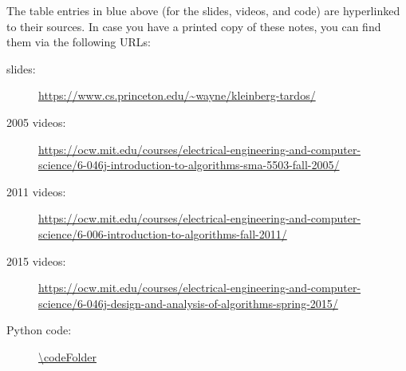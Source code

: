 \documentclass[11pt]{article}
\begin{document}
\medskip

The table entries in blue above (for the slides, videos, and code) are hyperlinked to their sources.
In case you have a printed copy of these notes, you can find them via the following
URLs:

\parbox{0.8\textwidth}{\footnotesize

  \begin{description}
  \item[\KT slides:] \url{https://www.cs.princeton.edu/~wayne/kleinberg-tardos/}
  \item[2005 videos:] \url{https://ocw.mit.edu/courses/electrical-engineering-and-computer-science/6-046j-introduction-to-algorithms-sma-5503-fall-2005/}
  \item[2011 videos:] \url{https://ocw.mit.edu/courses/electrical-engineering-and-computer-science/6-006-introduction-to-algorithms-fall-2011/}
    \item[2015 videos:] \url{https://ocw.mit.edu/courses/electrical-engineering-and-computer-science/6-046j-design-and-analysis-of-algorithms-spring-2015/}
    \item[Python code:] \expandafter\url\expandafter{\codeFolder}
    \end{description}
  }

\end{document}
